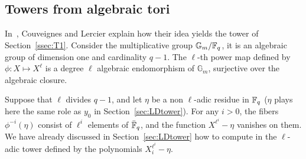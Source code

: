 \documentclass{sig-alternate}
\begin{document}






\subsection{Towers from algebraic tori}
\label{ssec:fibers-T2}
In~\cite{couveignes+lercier11}, Couveignes and Lercier explain how
their idea yields the tower of Section~\ref{ssec:T1}. Consider the
multiplicative group $\mathbb{G}_m/\mathbb{F}_q$, it is an algebraic group of
dimension one and cardinality $q-1$.  The $\ell$-th power map defined
by $\phi:X\mapsto X^\ell$ is a degree $\ell$ algebraic endomorphism of
$\mathbb{G}_m$, surjective over the algebraic closure.

Suppose that $\ell$ divides $q-1$, and let $\eta$ be a non $\ell$-adic
residue in $\mathbb{F}_q$ ($\eta$ plays here the same role as $y_0$ in
Section~\ref{sec:LDtower}). For any $i>0$, the fibers
$\phi^{-i}(\eta)$ consist of $\ell^i$ elements of $\bar{\mathbb{F}}_q$, and
the function $X^{\ell^i}-\eta$ vanishes on them. We have already
discussed in Section~\ref{sec:LDtower} how to compute in the
$\ell$-adic tower defined by the polynomials $X_i^{\ell^i}-\eta$.
\end{document}
